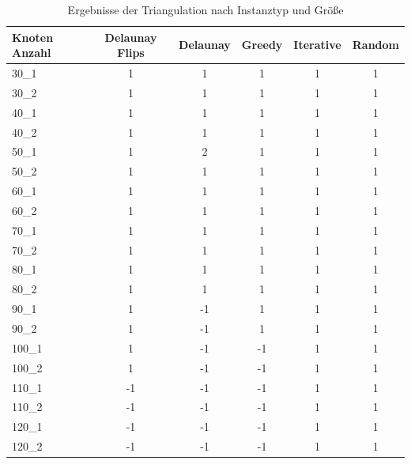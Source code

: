 \begin{table}[htbp]
\centering
\begin{tabular}{|l|c|c|c|c|c|}
\hline
Knoten Anzahl & Delaunay Flips & Delaunay & Greedy & Iterative & Random \\
\hline
30\_1 & 1 & 1 & 1 & 1 & 1 \\
30\_2 & 1 & 1 & 1 & 1 & 1 \\
40\_1 & 1 & 1 & 1 & 1 & 1 \\
40\_2 & 1 & 1 & 1 & 1 & 1 \\
50\_1 & 1 & 2 & 1 & 1 & 1 \\
50\_2 & 1 & 1 & 1 & 1 & 1 \\
60\_1 & 1 & 1 & 1 & 1 & 1 \\
60\_2 & 1 & 1 & 1 & 1 & 1 \\
70\_1 & 1 & 1 & 1 & 1 & 1 \\
70\_2 & 1 & 1 & 1 & 1 & 1 \\
80\_1 & 1 & 1 & 1 & 1 & 1 \\
80\_2 & 1 & 1 & 1 & 1 & 1 \\
90\_1 & 1 & -1 & 1 & 1 & 1 \\
90\_2 & 1 & -1 & 1 & 1 & 1 \\
100\_1 & 1 & -1 & -1 & 1 & 1 \\
100\_2 & 1 & -1 & -1 & 1 & 1 \\
110\_1 & -1 & -1 & -1 & 1 & 1 \\
110\_2 & -1 & -1 & -1 & 1 & 1 \\
120\_1 & -1 & -1 & -1 & 1 & 1 \\
120\_2 & -1 & -1 & -1 & 1 & 1 \\
\hline
\end{tabular}
\caption{Ergebnisse der Triangulation nach Instanztyp und Größe}
\label{tab:triangulation_results}
\end{table}
